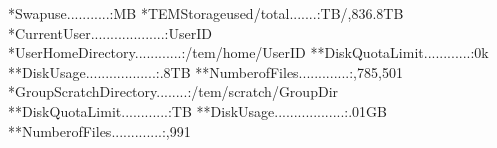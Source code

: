\documentclass[a4paper,10pt,english]{sphinxmanual}
\begin{document}
\begin{sphinxVerbatim}[commandchars=\\\{\}]
*Swapuse...........:MB
\PYGZhy{}\PYGZhy{}\PYGZhy{}\PYGZhy{}\PYGZhy{}\PYGZhy{}\PYGZhy{}\PYGZhy{}\PYGZhy{}\PYGZhy{}\PYGZhy{}\PYGZhy{}\PYGZhy{}\PYGZhy{}\PYGZhy{}\PYGZhy{}\PYGZhy{}\PYGZhy{}\PYGZhy{}\PYGZhy{}\PYGZhy{}\PYGZhy{}\PYGZhy{}\PYGZhy{}\PYGZhy{}\PYGZhy{}\PYGZhy{}\PYGZhy{}\PYGZhy{}\PYGZhy{}\PYGZhy{}\PYGZhy{}\PYGZhy{}\PYGZhy{}\PYGZhy{}\PYGZhy{}\PYGZhy{}\PYGZhy{}\PYGZhy{}\PYGZhy{}\PYGZhy{}\PYGZhy{}\PYGZhy{}\PYGZhy{}\PYGZhy{}\PYGZhy{}\PYGZhy{}\PYGZhy{}\PYGZhy{}\PYGZhy{}\PYGZhy{}\PYGZhy{}\PYGZhy{}\PYGZhy{}\PYGZhy{}\PYGZhy{}\PYGZhy{}\PYGZhy{}\PYGZhy{}\PYGZhy{}\PYGZhy{}\PYGZhy{}\PYGZhy{}\PYGZhy{}\PYGZhy{}\PYGZhy{}\PYGZhy{}\PYGZhy{}\PYGZhy{}\PYGZhy{}\PYGZhy{}\PYGZhy{}\PYGZhy{}\PYGZhy{}
*TEMStorageused/total.......:TB/,836.8TB\PYGZpc{}
*CurrentUser...................:\PYGZlt{}UserID\PYGZgt{}
*UserHomeDirectory............:/tem/home/\PYGZlt{}UserID\PYGZgt{}
**DiskQuotaLimit............:0k
**DiskUsage..................:.8TB
**NumberofFiles.............:,785,501
*GroupScratchDirectory........:/tem/scratch/\PYGZlt{}GroupDir\PYGZgt{}
**DiskQuotaLimit............:TB
**DiskUsage..................:.01GB
**NumberofFiles.............:,991

\end{sphinxVerbatim}
\end{document}
